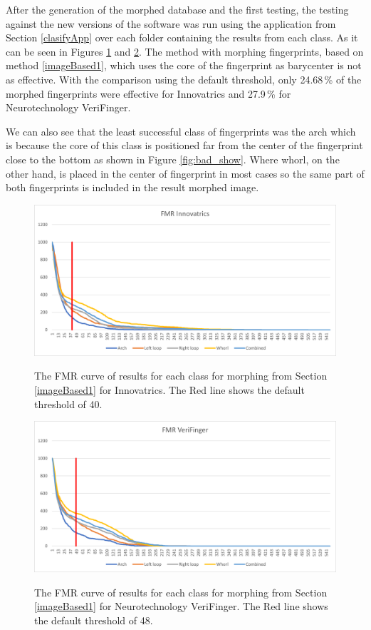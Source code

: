 After the generation of the morphed database and the first testing, the testing against the new versions of the software was run using the application from Section \ref{clasifyApp} over each folder containing the results from each class. As it can be seen in Figures \ref{fig:grapf_normal} and \ref{fig:grapf_normal_veri}. The method with morphing fingerprints, based on method \ref{imageBased1}, which uses the core of the fingerprint as barycenter is not as effective. With the comparison using the default threshold, only 24.68\,\% of the morphed fingerprints were effective for Innovatrics and 27.9\,\% for Neurotechnology VeriFinger.

We can also see that the least successful class of fingerprints was the arch which is because the core of this class is positioned far from the center of the fingerprint close to the bottom as shown in Figure \ref{fig:bad_show}. Where whorl, on the other hand, is placed in the center of fingerprint in most cases so the same part of both fingerprints is included in the result morphed image.

\begin{figure}[H]
    \centering
        {\includegraphics[width=0.8\linewidth]{obrazky-figures/results_core.png}}\\
        \caption{The FMR curve of results for each class for morphing from Section \ref{imageBased1} for Innovatrics. The Red line shows the default threshold of 40.}
        \label{fig:grapf_normal}
\end{figure}

\begin{figure}[H]
    \centering
        {\includegraphics[width=0.8\linewidth]{obrazky-figures/results_core_veri.png}}\\
        \caption{The FMR curve of results for each class for morphing from Section \ref{imageBased1} for Neurotechnology VeriFinger. The Red line shows the default threshold of 48.}
        \label{fig:grapf_normal_veri}
\end{figure}

